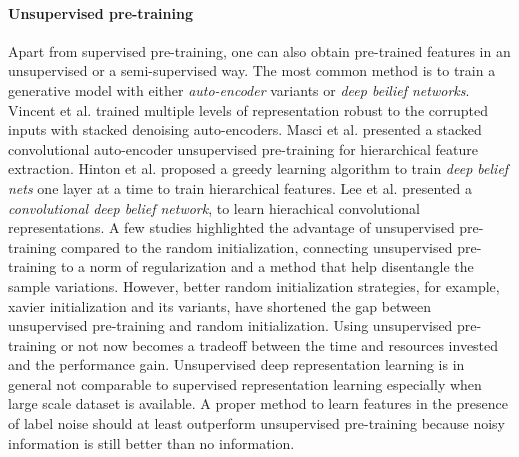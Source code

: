 \paragraph{Unsupervised pre-training}
Apart from supervised pre-training, one can also obtain pre-trained features in an unsupervised or a semi-supervised way.
The most common method is to train a generative model with either \textit{auto-encoder} variants or \textit{deep beilief networks}.
Vincent et al.\cite{vincent2010stacked} trained multiple levels of representation robust to the corrupted inputs with stacked denoising auto-encoders.
Masci et al.\cite{masci2011stacked} presented a stacked convolutional auto-encoder unsupervised pre-training for hierarchical feature extraction.
Hinton et al.\cite{hinton2006fast} proposed a greedy learning algorithm to train \textit{deep belief nets} one layer at a time to train hierarchical features.
Lee et al.\cite{lee2009convolutional} presented a \textit{convolutional deep belief network}, to learn hierachical convolutional representations.
A few studies\cite{erhan2009difficulty,erhan2010does,bengio2012deep} highlighted the advantage of unsupervised pre-training compared to the random initialization, connecting unsupervised pre-training to a norm of regularization and a method that help disentangle the sample variations.
However, better random initialization strategies, for example, xavier initialization\cite{glorot2010understanding} and its variants, have shortened the gap between unsupervised pre-training and random initialization.
Using unsupervised pre-training or not now becomes a tradeoff between the time and resources invested and the performance gain.
Unsupervised deep representation learning is in general not comparable to supervised representation learning especially when large scale dataset is available.
A proper method to learn features in the presence of label noise should at least outperform unsupervised pre-training because noisy information is still better than no information.


